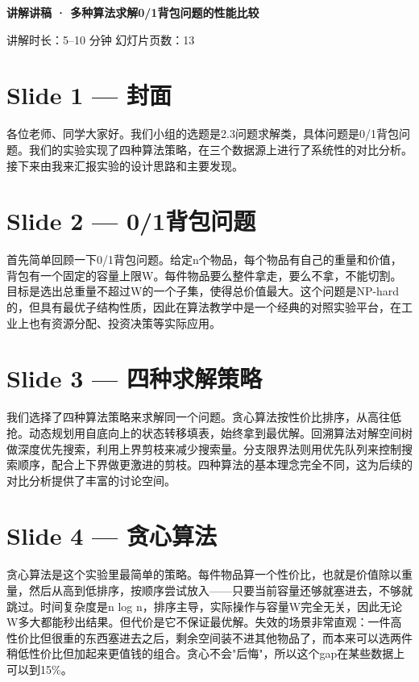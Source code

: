 \documentclass[12pt,a4paper]{ctexart}
\begin{document}
\begin{center}
{\Large \textbf{讲解讲稿 · 多种算法求解0/1背包问题的性能比较}}

\vspace{0.3cm}
讲解时长：5--10 分钟 \quad 幻灯片页数：13
\end{center}

\vspace{1cm}

\section*{Slide 1 — 封面}

各位老师、同学大家好。我们小组的选题是2.3问题求解类，具体问题是0/1背包问题。我们的实验实现了四种算法策略，在三个数据源上进行了系统性的对比分析。接下来由我来汇报实验的设计思路和主要发现。

\section*{Slide 2 — 0/1背包问题}

首先简单回顾一下0/1背包问题。给定n个物品，每个物品有自己的重量和价值，背包有一个固定的容量上限W。每件物品要么整件拿走，要么不拿，不能切割。目标是选出总重量不超过W的一个子集，使得总价值最大。这个问题是NP-hard的，但具有最优子结构性质，因此在算法教学中是一个经典的对照实验平台，在工业上也有资源分配、投资决策等实际应用。

\section*{Slide 3 — 四种求解策略}

我们选择了四种算法策略来求解同一个问题。贪心算法按性价比排序，从高往低抢。动态规划用自底向上的状态转移填表，始终拿到最优解。回溯算法对解空间树做深度优先搜索，利用上界剪枝来减少搜索量。分支限界法则用优先队列来控制搜索顺序，配合上下界做更激进的剪枝。四种算法的基本理念完全不同，这为后续的对比分析提供了丰富的讨论空间。

\section*{Slide 4 — 贪心算法}

贪心算法是这个实验里最简单的策略。每件物品算一个性价比，也就是价值除以重量，然后从高到低排序，按顺序尝试放入——只要当前容量还够就塞进去，不够就跳过。时间复杂度是n log n，排序主导，实际操作与容量W完全无关，因此无论W多大都能秒出结果。但代价是它不保证最优解。失效的场景非常直观：一件高性价比但很重的东西塞进去之后，剩余空间装不进其他物品了，而本来可以选两件稍低性价比但加起来更值钱的组合。贪心不会"后悔"，所以这个gap在某些数据上可以到15\%。
\end{document}
